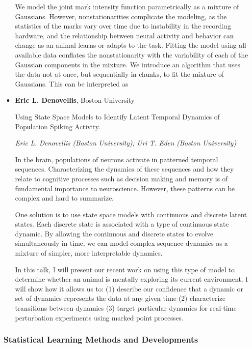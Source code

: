 \begin{itemize}
We model the joint mark intensity function parametrically as a mixture of Gaussians.  However, nonstationarities complicate the modeling, as the statistics of the marks vary over time due to instability in the recording hardware, and the relationship between neural activity and behavior can change as an animal learns or adapts to the task.  Fitting the model using all available data conflates the nonstationarity with the variability of each of the Gaussian components in the mixture.  We introduce an algorithm that uses the data not at once, but sequentially in chunks, to fit the mixture of Gaussians.   This can be interpreted as

\item \textbf{Eric L. Denovellis}, Boston University

Using State Space Models to Identify Latent Temporal Dynamics of Population Spiking Activity.

\emph{\footnotesize Eric L. Denovellis (Boston University); Uri T. Eden (Boston University)}

In the brain, populations of neurons activate in patterned temporal sequences. Characterizing the dynamics of these sequences and how they relate to cognitive processes such as decision making and memory is of fundamental importance to neuroscience. However, these patterns can be complex and hard to summarize.

One solution is to use state space models with continuous and discrete latent states. Each discrete state is associated with a type of continuous state dynamic. By allowing the continuous and discrete states to evolve simultaneously in time, we can model complex sequence dynamics as a mixture of simpler, more interpretable dynamics.

In this talk, I will present our recent work on using this type of model to determine whether an animal is mentally exploring its current environment. I will show how it allows us to: (1) describe our confidence that a dynamic or set of dynamics represents the data at any given time (2) characterize transitions between dynamics (3) target particular dynamics for real-time perturbation experiments using marked point processes.

\end{itemize}

\subsubsection*{Statistical Learning Methods and Developments}

